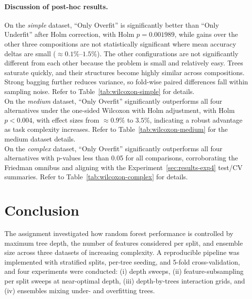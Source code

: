 \documentclass[conference]{IEEEtran}
\begin{document}
\paragraph{Discussion of post-hoc results.} On the \textit{simple} dataset, ``Only Overfit'' is significantly better than ``Only Underfit'' after Holm correction, with Holm $p=0.001989$, while gains over the other three compositions are not statistically significant where mean accuracy deltas are small (\(\approx0.1\%\)–\(1.5\%\)). The other configurations are not significantly different from each other because the problem is small and relatively easy. Trees saturate quickly, and their structures become highly similar across compositions. Strong bagging further reduces variance, so fold-wise paired differences fall within sampling noise. Refer to Table~\ref{tab:wilcoxon-simple} for details.\\

On the \textit{medium} dataset, ``Only Overfit'' significantly outperforms all four alternatives under the one-sided Wilcoxon with Holm adjustment, with Holm $p<0.004$, with effect sizes from \(\approx0.9\%\) to \(3.5\%\), indicating a robust advantage as task complexity increases. Refer to Table~\ref{tab:wilcoxon-medium} for the medium dataset details.\\

On the \textit{complex} dataset, ``Only Overfit'' significantly outperforms all four alternatives with p-values less than 0.05 for all comparisons, corroborating the Friedman omnibus and aligning with the Experiment~\ref{sec:results-exp4} test/CV summaries. Refer to Table~\ref{tab:wilcoxon-complex} for details.


\section{Conclusion}

The assignment investigated how random forest performance is controlled by maximum tree depth, the number of features considered per split, and ensemble size across three datasets of increasing complexity. A reproducible pipeline was implemented with stratified splits, per-tree seeding, and 5-fold cross-validation, and four experiments were conducted: (i) depth sweeps, (ii) feature-subsampling per split sweeps at near-optimal depth, (iii) depth-by-trees interaction grids, and (iv) ensembles mixing under- and overfitting trees.
\end{document}
